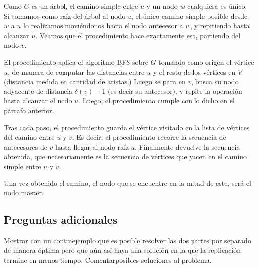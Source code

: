 \documentclass[a4paper, 10pt, twoside]{article}
\begin{document}
Como $G$ es un árbol, el camino simple entre $u$ y un nodo $w$ cualquiera es único. Si tomamos como raíz del árbol al nodo $u$, el único camino simple posible desde $w$ a $u$ lo realizamos moviéndonos hacia el nodo antecesor a $w$, y repitiendo hasta alcanzar $u$. Veamos que el procedimiento hace exactamente eso, partiendo del nodo $v$.

El procedimiento aplica el algoritmo BFS sobre $G$ tomando como origen el vértice $u$, de manera de computar las distancias entre $u$ y el resto de los vértices en $V$ (distancia medida en cantidad de aristas.) Luego se para en $v$, busca su nodo adyacente de distancia $\delta(v) - 1$ (es decir su antecesor), y repite la operación hasta alcanzar el nodo $u$. Luego, el procedimiento cumple con lo dicho en el párrafo anterior.

Tras cada paso, el procedimiento guarda el vértice visitado en la lista de vértices del camino entre $u$ y $v$. Es decir, el procedimiento recorre la secuencia de antecesores de $v$ hasta llegar al nodo raíz $u$. Finalmente devuelve la secuencia obtenida, que necesariamente es la secuencia de vértices que yacen en el camino simple entre $u$ y $v$.

Una vez obtenido el camino, el nodo que se encuentre en la mitad de este, será el nodo master.


\subsection{Preguntas adicionales}

Mostrar con un contraejemplo que es posible resolver las dos partes por separado de manera óptima pero que aún así haya una solución en la que la replicación termine en menos tiempo. Comentarposibles soluciones al problema.
\end{document}
